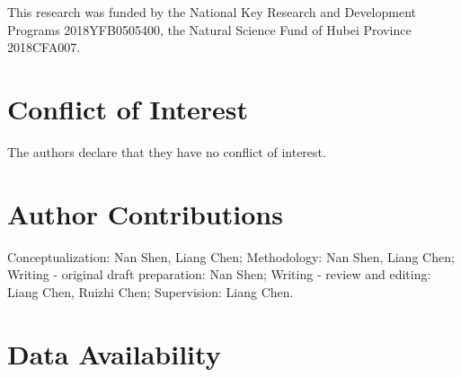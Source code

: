 \documentclass{svjour3}                     %
\begin{document}
\begin{acknowledgements}
This research was funded by the National Key Research and Development Programs 2018YFB0505400, the Natural Science Fund of Hubei Province 2018CFA007.
\end{acknowledgements}

%
\section*{Conflict of Interest}
The authors declare that they have no conflict of interest.
\section*{Author Contributions}
Conceptualization: Nan Shen, Liang Chen; Methodology: Nan Shen, Liang Chen; Writing - original draft preparation: Nan Shen; Writing - review and editing: Liang Chen, Ruizhi Chen; Supervision: Liang Chen.
 \section*{Data Availability}



\end{document}
